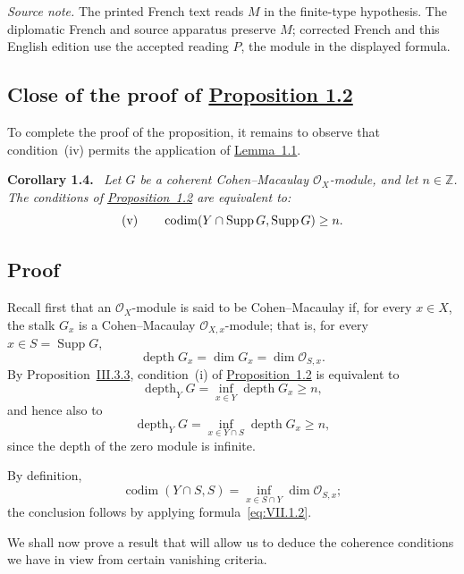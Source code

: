 \documentclass[11pt,a4paper,oneside]{book}
\providecommand{\Oo}{\mathcal O}
\providecommand{\OX}{\mathcal O_X}
\providecommand{\Supp}{\operatorname{Supp}}
\providecommand{\codimop}{\operatorname{codim}}
\providecommand{\depthop}{\operatorname{depth}}
\newenvironment{sgastatement}[1]
  {\par\addvspace{0.8\baselineskip}\noindent\textbf{#1.}\ \itshape}
  {\par\addvspace{0.35\baselineskip}}
\theoremstyle{plain}
\theoremstyle{definition}
\theoremstyle{remark}
\begin{document}
\noindent\textit{Source note.} The printed French text reads $M$ in the
finite-type hypothesis. The diplomatic French and source apparatus preserve
$M$; corrected French and this English edition use the accepted reading $P$,
the module in the displayed formula.

\subsection*{Close of the proof of \hyperref[VII.1.2]{Proposition 1.2}}
To complete the proof of the proposition, it remains to observe that
condition~(iv) permits the application of \hyperref[VII.1.1]{Lemma~1.1}.

\begin{sgastatement}{Corollary 1.4}
Let $G$ be a coherent Cohen--Macaulay $\OX$-module, and let $n\in\mathbb Z$.
The conditions of \hyperref[VII.1.2]{Proposition~1.2} are equivalent to:
\[
  \textup{(v)}\qquad
  \codimop(Y\cap\Supp G,\Supp G)\geq n.
\]
\end{sgastatement}

\subsection*{Proof}
Recall first that an $\OX$-module is said to be Cohen--Macaulay if, for every
$x\in X$, the stalk $G_x$ is a Cohen--Macaulay $\Oo_{X,x}$-module; that is,
for every $x\in S=\Supp G$,
\begin{equation}
  \depthop G_x=\dim G_x=\dim\Oo_{S,x}.
  \tag{1.2}\label{eq:VII.1.2}
\end{equation}
By Proposition~\hyperref[III.3.3]{III.3.3}, condition~(i) of \hyperref[VII.1.2]{Proposition~1.2} is equivalent to
\begin{equation}
  \depthop_Y G=\inf_{x\in Y}\depthop G_x\geq n,
  \tag{1.3}\label{eq:VII.1.3}
\end{equation}
and hence also to
\[
  \depthop_Y G=\inf_{x\in Y\cap S}\depthop G_x\geq n,
\]
since the depth of the zero module is infinite.

By definition,
\[
  \codimop(Y\cap S,S)=\inf_{x\in S\cap Y}\dim\Oo_{S,x};
\]
the conclusion follows by applying formula~\eqref{eq:VII.1.2}.

We shall now prove a result that will allow us to deduce the coherence
conditions we have in view from certain vanishing criteria.
\end{document}
